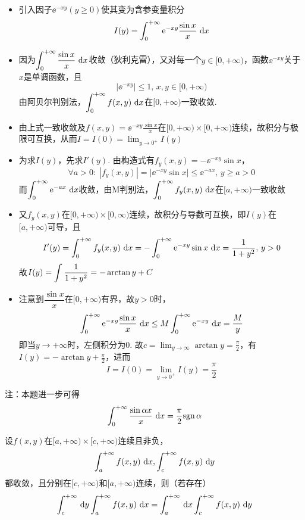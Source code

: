 \begin{analysis}
\begin{itemize}
\item 引入因子$\ee^{-xy}(y\geq 0)$使其变为含参变量积分
\[I(y)=\displaystyle\int_{0}^{+\infty}{\mathrm{e}^{-xy}\frac{\sin x}{x}}\,\,\mathrm{d} x\]
\item 因为$\displaystyle\int_{0}^{+\infty}{\frac{\sin x}{x}}\,\,\mathrm{d} x$收敛（狄利克雷），又对每一个$y\in[0,+\infty)$，函数$\ee^{-xy}$关于$x$是单调函数，且
\[|\ee^{-xy}|\leq 1,\,x,y\in[0,+\infty)\]
由阿贝尔判别法，$\displaystyle\int_{0}^{+\infty}{f(x,y)}\,\,\mathrm{d} x$在$[0,+\infty)$一致收敛.
\item 由上式一致收敛及$f(x,y)=\ee^{-xy}\frac{\sin x}{x}$在$[0,+\infty)\times[0,+\infty)$连续，故积分与极限可互换，从而$I=I(0)=\lim_{y\to 0^+}I(y)$
\item 为求$I(y)$，先求$I'(y)$.
由构造式有$f_y(x,y)=-\ee^{-xy}\sin x$，
\[\forall a>0:\;|f_y(x,y)|=|\ee^{-xy}\sin x|\leq \ee^{-ax},\,y\geq a>0\]
而$\displaystyle\int_{0}^{+\infty}{\mathrm{e}^{-ax}}\,\,\mathrm{d} x$收敛，由M判别法，$\displaystyle\int_{0}^{+\infty}{f_y(x,y)}\,\,\mathrm{d} x$在$[a,+\infty)$一致收敛
\item 又$f_y(x,y)$在$[0,+\infty)\times[0,\infty)$连续，故积分与导数可互换，即$I(y)$在$[a,+\infty)$可导，且
\[I'(y)=\displaystyle\int_{0}^{+\infty}{f_y(x,y)}\,\,\mathrm{d} x=-\displaystyle\int_{0}^{+\infty}{\mathrm{e}^{-xy}\sin x}\,\,\mathrm{d} x=\frac{1}{1+y^2},\,y>0\]
故$I(y)=\displaystyle\int\frac{1}{1+y^2}=-\arctan y+C$
\item 注意到$\dfrac{\sin x}{x}$在$[0,+\infty)$有界，故$y>0$时，
\[\displaystyle\int_{0}^{+\infty}{\mathrm{e}^{-xy}\frac{\sin x}{x}}\,\,\mathrm{d} x\leq M\displaystyle\int_{0}^{+\infty}{\mathrm{e}^{-xy}}\,\,\mathrm{d} x=\frac{M}{y}\]
即当$y\to +\infty$时，左侧积分为$0$.
故$c=\lim_{y\to\infty}\arctan y=\frac{\pi}{2}$，有$I(y)=-\arctan y+\frac{\pi}{2}$，进而
\[I=I(0)=\lim_{y\to 0^+}I(y)=\frac{\pi}{2}\]
\end{itemize}
注：本题进一步可得
\[\displaystyle\int_{0}^{+\infty}{\frac{\sin\alpha x}{x}}\,\,\mathrm{d} x=\frac{\pi}{2}\mathrm{sgn}\,\alpha\]
\end{analysis}
\begin{theorem}
设$f(x,y)$在$[a,+\infty)\times[c,+\infty)$连续且非负，
\[\displaystyle\int_{a}^{+\infty}{f(x,y)}\,\,\mathrm{d} x,\displaystyle\int_{c}^{+\infty}{f(x,y)}\,\,\mathrm{d} y\]
都收敛，且分别在$[c,+\infty)$和$[a,+\infty)$连续，则（若存在）
\[\int_c^{+\infty}\,\mathrm{d} y\displaystyle\int_{a}^{+\infty}{f(x,y)}\,\,\mathrm{d} x=\int_a^{+\infty}\,\mathrm{d} x\displaystyle\int_{c}^{+\infty}{f(x,y)}\,\,\mathrm{d} y\]
\end{theorem}